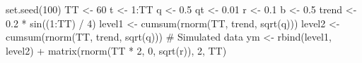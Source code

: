 \begin{Schunk}
\begin{Sinput}
 set.seed(100)
 TT <- 60
 t <- 1:TT
 q <- 0.5
 qt <- 0.01
 r <- 0.1
 b <- 0.5
 trend <- 0.2 * sin((1:TT) / 4)
 level1 <- cumsum(rnorm(TT, trend, sqrt(q)))
 level2 <- cumsum(rnorm(TT, trend, sqrt(q)))
 # Simulated data
 ym <- rbind(level1, level2) + matrix(rnorm(TT * 2, 0, sqrt(r)), 2, TT)
\end{Sinput}
\end{Schunk}
